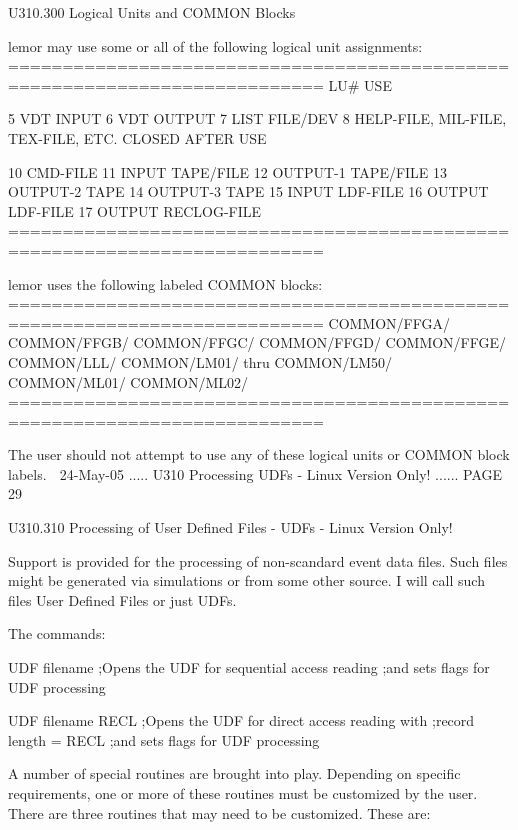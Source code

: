  
 
   U310.300  Logical Units and COMMON Blocks
 
   lemor may use some or all of the following logical unit assignments:
   ===========================================================================
   LU#     USE
 
     5     VDT INPUT
     6     VDT OUTPUT
     7     LIST FILE/DEV
     8     HELP-FILE, MIL-FILE, TEX-FILE, ETC. CLOSED AFTER USE
 
    10     CMD-FILE
    11     INPUT    TAPE/FILE
    12     OUTPUT-1 TAPE/FILE
    13     OUTPUT-2 TAPE
    14     OUTPUT-3 TAPE
    15     INPUT    LDF-FILE
    16     OUTPUT   LDF-FILE
    17     OUTPUT   RECLOG-FILE
   ===========================================================================
 
 
 
 
 
   lemor uses the following labeled COMMON blocks:
   ===========================================================================
   COMMON/FFGA/
   COMMON/FFGB/
   COMMON/FFGC/
   COMMON/FFGD/
   COMMON/FFGE/
   COMMON/LLL/
   COMMON/LM01/ thru COMMON/LM50/
   COMMON/ML01/
   COMMON/ML02/
   ===========================================================================
 
   The  user  should  not  attempt to use any of these logical units or COMMON
   block labels.
    
   24-May-05 ..... U310  Processing UDFs - Linux Version Only! ...... PAGE  29
 
 
   U310.310  Processing of User Defined Files - UDFs - Linux Version Only!
 
   Support is provided for the processing of non-scandard  event  data  files.
   Such  files might be generated via simulations or from some other source. I
   will call such files User Defined Files or just UDFs.
 
   The commands:
 
   UDF filename      ;Opens the UDF for sequential access reading
                     ;and sets flags for UDF processing
 
   UDF filename RECL ;Opens the UDF for direct access reading with
                     ;record length = RECL
                     ;and sets flags for UDF processing
 
   A number of special routines are brought into play. Depending  on  specific
   requirements, one or more of these routines must be customized by the user.
   There are three routines that may need to be customized. These are:
 

